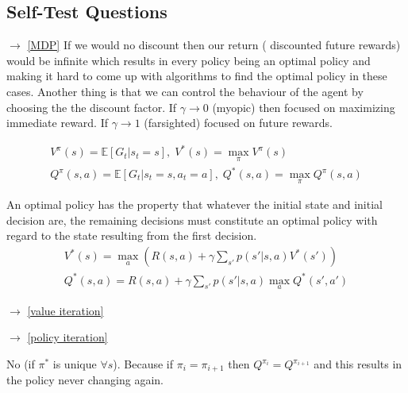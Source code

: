 \subsection{Self-Test Questions}
\begin{enumerate}
     $\rightarrow$ \ref{MDP}
     \newline If we would no discount then our 
    return ( discounted future rewards) would be infinite which results in every policy 
    being an optimal policy and making it hard to come up with algorithms to find the 
    optimal policy in these cases. Another thing is that we can control the behaviour of 
    the agent by choosing the the discount factor. If $\gamma \rightarrow  0$ (myopic) 
    then focused on maximizing immediate reward. If $\gamma \rightarrow  1$ (farsighted)
    focused on future rewards.
    
    \begin{gather*}
        V^{\pi}(s) = \mathbb{E}[G_t | s_t =s],\;V^*(s)= \max\limits_\pi V^{\pi}(s) \\
        Q^{\pi}(s,a) = \mathbb{E}[G_t | s_t =s,a_t = a],\;Q^*(s,a)= \max\limits_\pi Q^{\pi}(s,a)
    \end{gather*}
    
    \newline 
   An optimal policy has the property that whatever the initial state and initial 
   decision are, the remaining decisions must constitute an optimal policy with regard 
   to the state resulting from the first decision.
   \begin{gather*}
       V^* (s) = \max\limits_a \left(R(s,a)+\gamma \sum_{s'} p(s'|s,a)V^{*}(s')\right) \\
       Q^*(s,a) = R(s,a) + \gamma \sum_{s'}p(s'|s,a)\max\limits_a Q^{*}(s',a')
   \end{gather*}
    
     $\rightarrow$ \ref{value iteration}
    
     $\rightarrow$ \ref{policy iteration}

    \newline
     No (if $\pi^{*}$ is unique $\forall s$). Because if $\pi_{i}=\pi_{i+1}$ then $ Q^{\pi_i} =  Q^{\pi_{i+1}}$ 
     and this results in the policy never changing again.


\end{enumerate}
